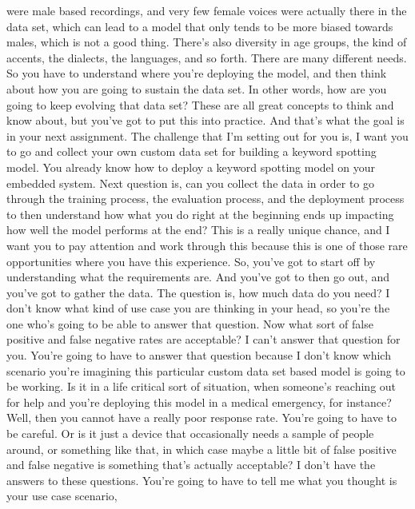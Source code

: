     were male based recordings, and very few female voices were actually there
    in the data set, which can lead to a model that
    only tends to be more biased towards males, which is not a good thing.
    There's also diversity in age groups, the kind of accents,
    the dialects, the languages, and so forth.
    There are many different needs.
    So you have to understand where you're deploying the model,
    and then think about how you are going to sustain the data set.
    In other words, how are you going to keep evolving that data set?
    These are all great concepts to think and know about,
    but you've got to put this into practice.
    And that's what the goal is in your next assignment.
    The challenge that I'm setting out for you
    is, I want you to go and collect your own custom data
    set for building a keyword spotting model.
    You already know how to deploy a keyword spotting model on your embedded system.
    Next question is, can you collect the data
    in order to go through the training process, the evaluation
    process, and the deployment process to then understand
    how what you do right at the beginning ends up impacting
    how well the model performs at the end?
    This is a really unique chance, and I want
    you to pay attention and work through this
    because this is one of those rare opportunities where
    you have this experience.
    So, you've got to start off by understanding
    what the requirements are.
    And you've got to then go out, and you've got to gather the data.
    The question is, how much data do you need?
    I don't know what kind of use case you are thinking in your head,
    so you're the one who's going to be able to answer that question.
    Now what sort of false positive and false negative rates are acceptable?
    I can't answer that question for you.
    You're going to have to answer that question because I don't know which
    scenario you're imagining this particular custom data set based model
    is going to be working.
    Is it in a life critical sort of situation,
    when someone's reaching out for help and you're
    deploying this model in a medical emergency, for instance?
    Well, then you cannot have a really poor response rate.
    You're going to have to be careful.
    Or is it just a device that occasionally needs a sample of people around,
    or something like that, in which case maybe
    a little bit of false positive and false negative
    is something that's actually acceptable?
    I don't have the answers to these questions.
    You're going to have to tell me what you thought is your use case scenario,
